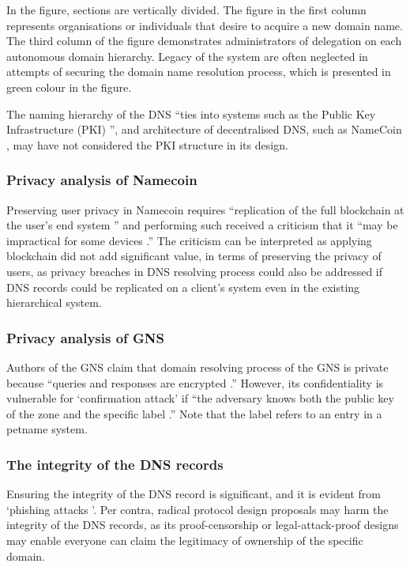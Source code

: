 In the figure, sections are vertically divided.
The figure in the first column represents organisations or individuals that desire to acquire a new domain name.
The third column of the figure demonstrates administrators of delegation on each autonomous domain hierarchy.
Legacy of the system are often neglected in attempts of securing the domain name resolution process, which is presented in green colour in the figure. 

The naming hierarchy of the DNS ``ties into systems such as the Public Key Infrastructure (PKI) \cite{akamai-dns-architecture}'', and architecture of decentralised DNS, such as NameCoin \cite{loibl2014namecoin}, may have not considered the PKI structure in its design.

\subsubsection{Privacy analysis of Namecoin}
Preserving user privacy in Namecoin requires ``replication of the full blockchain at the user's end system \cite{grothoff2017nsa}'' and performing such received a criticism that it ``may be impractical for some devices \cite{grothoff2017nsa}.''
The criticism can be interpreted as applying blockchain did not add significant value, in terms of preserving the privacy of users, as privacy breaches in DNS resolving process could also be addressed if DNS records could be replicated on a client's system even in the existing hierarchical system. 

\subsubsection{Privacy analysis of GNS}
Authors of the GNS claim that domain resolving process of the GNS is private because ``queries and responses are encrypted \cite{grothoff2017nsa, wachs2014censorship}.''
However, its confidentiality is vulnerable for `confirmation attack' if ``the adversary knows both the public key of the zone and the specific label \cite{wachs2014censorship}.'' Note that the label refers to an entry in a petname system. 

\subsubsection{The integrity of the DNS records}
Ensuring the integrity of the DNS record is significant, and it is evident from `phishing attacks \cite{ariyapperuma2007security, ollmann2004phishing}'.
Per contra, radical protocol design proposals may harm the integrity of the DNS records, as its proof-censorship or legal-attack-proof designs may enable everyone can claim the legitimacy of ownership of the specific domain.

